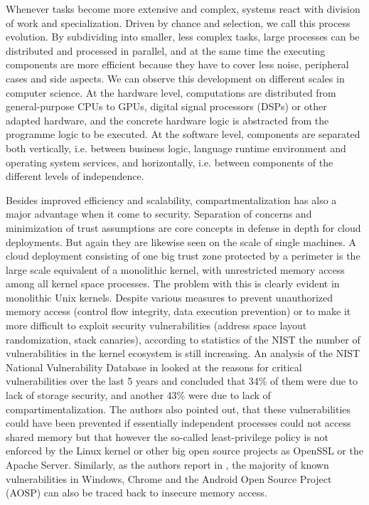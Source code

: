 
Whenever tasks become more extensive and complex, systems react with division of work and specialization. Driven by chance and selection, we call this process evolution. By subdividing into smaller, less complex tasks, large processes can be distributed and processed in parallel, and at the same time the executing components are more efficient because they have to cover less noise, peripheral cases and side aspects. We can observe this development on different scales in computer science. At the hardware level, computations are distributed from general-purpose CPUs to GPUs, digital signal processors (DSPs) or other adapted hardware, and the concrete hardware logic is abstracted from the programme logic to be executed. At the software level, components are separated both vertically, i.e. between business logic, language runtime environment and operating system services, and horizontally, i.e. between components of the different levels of independence. 

Besides improved efficiency and scalability, compartmentalization has also a major advantage when it come to security. Separation of concerns and minimization of trust assumptions are core concepts in defense in depth for cloud deployments. But again they are likewise seen on the scale of single machines. A cloud deployment consisting of one big trust zone protected by a perimeter is the large scale equivalent of a monolithic kernel, with unrestricted memory access among all kernel space processes. The problem with this is clearly evident in monolithic Unix kernels. Despite various measures to prevent unauthorized memory access (control flow integrity, data execution prevention) or to make it more difficult to exploit security vulnerabilities (address space layout randomization, stack canaries), according to statistics of the NIST\cite{nvd} the number of vulnerabilities in the kernel ecosystem is still increasing. An analysis of the NIST National Vulnerability Database in \cite{mckee2022novel} looked at the reasons for critical vulnerabilities over the last 5 years and concluded that 34\% of them were due to lack of storage security, and another 43\% were due to lack of compartimentalization. The authors also pointed out, that these vulnerabilities could have been prevented if essentially independent processes could not access shared memory but that however the so-called least-privilege policy is not enforced by the Linux kernel or other big open source projects as OpenSSL or the Apache Server. 
Similarly, as the authors report in \cite{kirth2022pkru}, the majority of known vulnerabilities in Windows, Chrome and the Android Open Source Project (AOSP) can also be traced back to insecure memory access. 

